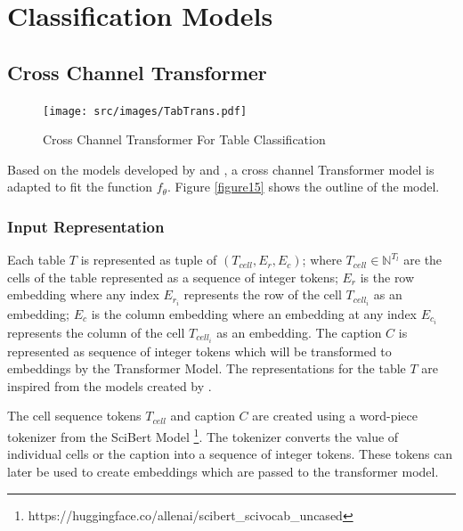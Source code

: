 \section{Classification Models}
\label{table_classification:models}

\subsection{Cross Channel Transformer}
\begin{figure}[h]
    \centering
    \texttt{[image: src/images/TabTrans.pdf]}
    \caption{Cross Channel Transformer For Table Classification}
    \label{figure\arabic{figurecounter}}
\end{figure}

Based on the models developed by \cite{deng2020turl} and \cite{tsai2019multimodal}, a cross channel Transformer model is adapted to fit the function $f_\theta$. Figure \ref{figure15} shows the outline of the model.

\subsubsection{Input Representation}
Each table $T$ is represented as tuple of $(T_{cell},E_r,E_c)$; where $T_{cell} \in \mathbb{N}^{T_l}$ are the cells of the table represented as a sequence of integer tokens; $E_r$ is the row embedding where any index $E_{r_{i}}$ represents the row of the cell $T_{cell_{i}}$ as an embedding;  $E_c$ is the column embedding where an embedding at any index $E_{c_{i}}$ represents the column of the cell $T_{cell_{i}}$ as an embedding. The caption $C$ is represented as sequence of integer tokens which will be transformed to embeddings by the Transformer Model. The representations for the table $T$ are inspired from the models created by \cite{deng2020turl}. 

The cell sequence tokens $T_{cell}$ and caption $C$ are created using a word-piece tokenizer from the SciBert Model \footnote{https://huggingface.co/allenai/scibert\_scivocab\_uncased}. The tokenizer converts the value of individual cells or the caption into a sequence of integer tokens. These tokens can later be used to create embeddings which are passed to the  transformer model. 

